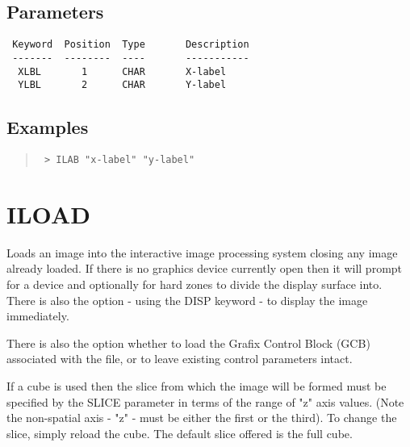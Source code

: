 \documentclass{book}
\renewcommand{\_}{{\tt\char'137}}     %
\begin{document}
\subsection{Parameters}
\begin{verbatim}
 Keyword  Position  Type       Description
 -------  --------  ----       -----------
  XLBL       1      CHAR       X-label
  YLBL       2      CHAR       Y-label

\end{verbatim}\subsection{Examples}
\begin{quote}\begin{verbatim}
 > ILAB "x-label" "y-label"
 \end{verbatim}\end{quote}
\section{ILOAD}
Loads an image into the interactive image processing system closing
any image already loaded. If there is no graphics device currently
open then it will prompt for a device and optionally for hard zones
to divide the display surface into. There is also the option - using
the DISP keyword - to display the image immediately.

There is also the option whether to load the Grafix Control Block
(GCB) associated with the file, or to leave existing control
parameters intact.

If a cube is used then the slice from which the image will be
formed must be specified by the SLICE parameter in terms of
the range of "z" axis values. (Note the non-spatial axis
- "z" - must be either the first or the third). To change
the slice, simply reload the cube. The default slice
offered is the full cube.
\end{document}
